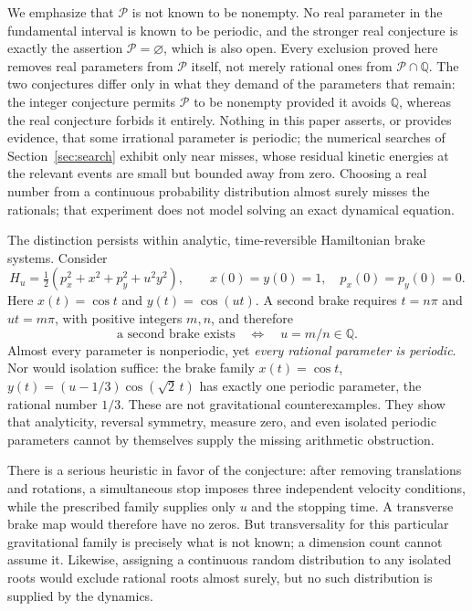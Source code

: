 We emphasize that $\mathcal P$ is not known to be nonempty. No real
parameter in the fundamental interval is known to be periodic, and the
stronger real conjecture is exactly the assertion $\mathcal P=\varnothing$,
which is also open. Every exclusion proved here removes real parameters
from $\mathcal P$ itself, not merely rational ones from
$\mathcal P\cap\mathbb Q$. The two conjectures differ only in what they
demand of the parameters that remain: the integer conjecture permits
$\mathcal P$ to be nonempty provided it avoids $\mathbb Q$, whereas the
real conjecture forbids it entirely. Nothing in this paper asserts, or
provides evidence, that some irrational parameter is periodic; the
numerical searches of Section~\ref{sec:search} exhibit only near misses,
whose residual kinetic energies at the relevant events are small but
bounded away from zero. Choosing a real number from a
continuous probability distribution almost surely misses the rationals;
that experiment does not model solving an exact dynamical equation.

The distinction persists within analytic, time-reversible Hamiltonian
brake systems. Consider
\[
 H_u=\tfrac12(p_x^2+x^2+p_y^2+u^2y^2),\qquad
 x(0)=y(0)=1,\quad p_x(0)=p_y(0)=0.
\]
Here $x(t)=\cos t$ and $y(t)=\cos(ut)$. A second brake requires
$t=n\pi$ and $ut=m\pi$, with positive integers $m,n$, and therefore
\[
 \text{a second brake exists}\quad\Longleftrightarrow\quad
 u=m/n\in\mathbb Q.
\]
Almost every parameter is nonperiodic, yet \emph{every rational parameter
is periodic}. Nor would isolation suffice: the brake family
$x(t)=\cos t$, $y(t)=(u-1/3)\cos(\sqrt2\,t)$ has exactly one periodic
parameter, the rational number $1/3$.
These are not gravitational counterexamples. They show that analyticity,
reversal symmetry, measure zero, and even isolated periodic parameters
cannot by themselves supply the missing arithmetic obstruction.

There is a serious heuristic in favor of the conjecture: after removing
translations and rotations, a simultaneous stop imposes three independent
velocity conditions, while the prescribed family supplies only $u$ and
the stopping time. A transverse brake map would therefore have no zeros.
But transversality for this particular gravitational family is precisely
what is not known; a dimension count cannot assume it. Likewise, assigning
a continuous random distribution to any isolated roots would exclude
rational roots almost surely, but no such distribution is supplied by
the dynamics.

